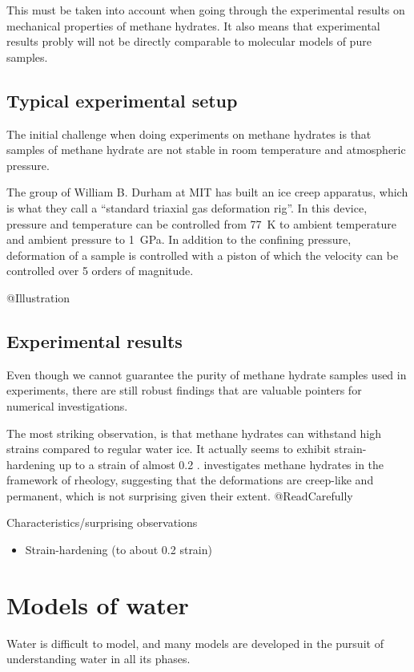 This must be taken into account when going through the experimental results on mechanical properties of methane hydrates. It also means that experimental results probly will not be directly comparable to molecular models of pure samples.

\subsection{Typical experimental setup}
The initial challenge when doing experiments on methane hydrates is that samples of methane hydrate are not stable in room temperature and atmospheric pressure.

The group of William B. Durham at MIT has built an ice creep apparatus, which is what they call a ``standard triaxial gas deformation rig''. In this device, pressure and temperature can be controlled from \SI{77}{\kelvin} to ambient temperature and ambient pressure to \SI{1}{\giga\pascal}. In addition to the confining pressure, deformation of a sample is controlled with a piston of which the velocity can be controlled over 5 orders of magnitude.

@Illustration

\subsection{Experimental results}
Even though we cannot guarantee the purity of methane hydrate samples used in experiments, there are still robust findings that are valuable pointers for numerical investigations. 

The most striking observation, is that methane hydrates can withstand high strains compared to regular water ice. It actually seems to exhibit strain-hardening up to a strain of almost 0.2 \cite{Durham2003, Stern1998}. \cite{Durham2003} investigates methane hydrates in the framework of rheology, suggesting that the deformations are creep-like and permanent, which is not surprising given their extent. @ReadCarefully 

Characteristics/surprising observations
\begin{itemize}
\item Strain-hardening (to about 0.2 strain)
\end{itemize}

\section{Models of water}
Water is difficult to model, and many models are developed in the pursuit of understanding water in all its phases. 


